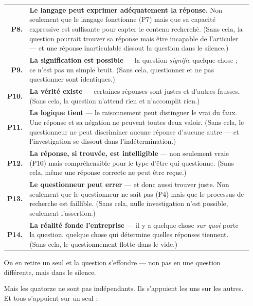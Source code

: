\documentclass[10pt, openany, oneside]{book}
\renewcommand{\footnotesize}{\fontsize{8.5}{11}\selectfont}
\begin{document}
{\footnotesize
\noindent\begin{tabular}{r p{}}
\textbf{P8.} & \textbf{Le langage peut exprimer adéquatement la réponse.} Non seulement que le langage fonctionne (P7) mais que sa capacité expressive est suffisante pour capter le contenu recherché. (Sans cela, la question pourrait trouver sa réponse mais être incapable de l'articuler --- et une réponse inarticulable dissout la question dans le silence.) \\[0.3em]
\textbf{P9.} & \textbf{La signification est possible} --- la question \textit{signifie} quelque chose ; ce n'est pas un simple bruit. (Sans cela, questionner et ne pas questionner sont identiques.) \\[0.3em]
\textbf{P10.} & \textbf{La vérité existe} --- certaines réponses sont justes et d'autres fausses. (Sans cela, la question n'attend rien et n'accomplit rien.) \\[0.3em]
\textbf{P11.} & \textbf{La logique tient} --- le raisonnement peut distinguer le vrai du faux. Une réponse et sa négation ne peuvent toutes deux valoir. (Sans cela, le questionneur ne peut discriminer aucune réponse d'aucune autre --- et l'investigation se dissout dans l'indétermination.) \\[0.3em]
\textbf{P12.} & \textbf{La réponse, si trouvée, est intelligible} --- non seulement vraie (P10) mais compréhensible pour le type d'être qui questionne. (Sans cela, même une réponse correcte ne peut être reçue.) \\[0.3em]
\textbf{P13.} & \textbf{Le questionneur peut errer} --- et donc aussi trouver juste. Non seulement que le questionneur ne sait pas (P4) mais que le processus de recherche est faillible. (Sans cela, nulle investigation n'est possible, seulement l'assertion.) \\[0.3em]
\textbf{P14.} & \textbf{La réalité fonde l'entreprise} --- il y a quelque chose \textit{sur quoi} porte la question, quelque chose qui détermine quelles réponses tiennent. (Sans cela, le questionnement flotte dans le vide.) \\[0.3em]
\end{tabular}
}

\vspace{0.8em}

\noindent On en retire un seul et la question s'effondre --- non pas en une question différente, mais dans le silence.

Mais les quatorze ne sont pas indépendants. Ils s'appuient les uns sur les autres. Et tous s'appuient sur un seul :
\end{document}
